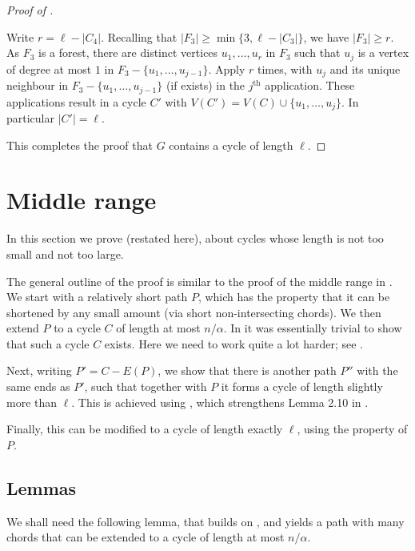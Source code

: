 \documentclass[11pt,english]{article}
\theoremstyle{plain}
\theoremstyle{definition}
\theoremstyle{remark}
\begin{document}
\begin{proof}[Proof of ]
\begin{itemize}
					Write $r = \ell - |C_4|$.
					Recalling that $|F_3| \ge \min\{3, \ell - |C_3|\}$, we have $|F_3| \ge r$. As $F_3$ is a forest, there are distinct vertices $u_1, \ldots, u_r$ in $F_3$ such that $u_j$ is a vertex of degree at most $1$ in $F_3 - \{u_1, \ldots, u_{j-1}\}$. 
					Apply  $r$ times, with $u_j$ and its unique neighbour in $F_3 - \{u_1, \ldots, u_{j-1}\}$ (if exists) in the $j^{\text{th}}$ application. These applications result in a cycle $C'$ with $V(C') = V(C) \cup \{u_1, \ldots, u_j\}$. In particular $|C'| = \ell$.
			\end{itemize}
			This completes the proof that $G$ contains a cycle of length $\ell$.
		\end{proof}



\section{Middle range} \label{sec:middle}

	In this section we prove  (restated here), about cycles whose length is not too small and not too large. 

	\lemMiddleRange*

	The general outline of the proof is similar to the proof of the middle range in \cite{draganic2023chvatal}. We start with a relatively short path $P$, which has the property that it can be shortened by any small amount (via short non-intersecting chords). We then extend $P$ to a cycle $C$ of length at most $n/\alpha$. In \cite{draganic2023chvatal} it was essentially trivial to show that such a cycle $C$ exists. Here we need to work quite a lot harder; see . 

	Next, writing $P' = C - E(P)$, we show that there is another path $P''$ with the same ends as $P'$, such that together with $P$ it forms a cycle of length slightly more than $\ell$. 
	This is achieved using , which strengthens Lemma 2.10 in \cite{draganic2023chvatal}.

	Finally, this can be modified to a cycle of length exactly $\ell$, using the property of $P$. 

	\subsection{Lemmas}

		We shall need the following lemma, that builds on , and yields a path with many chords that can be extended to a cycle of length at most $n/\alpha$.
\end{document}
